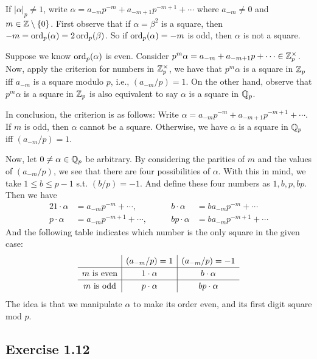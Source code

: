 \documentclass[../Koblitz.tex]{subfiles}
\begin{document}
If $|\alpha|_p\neq1$, write $\alpha=a_{-m}p^{-m}+a_{-m+1}p^{-m+1}+\cdots$ where $a_{-m}\neq0$ and $m\in\mathbb{Z}\setminus\{0\}$. First observe that if $\alpha=\beta^2$ is a square, then $-m=\operatorname{ord}_p(\alpha)=2\operatorname{ord}_p(\beta)$. So if $\operatorname{ord}_p(\alpha)=-m$ is odd, then $\alpha$ is not a square.

Suppose we know $\operatorname{ord}_p(\alpha)$ is even. Consider $p^m\alpha = a_{-m}+a_{-m+1}p+\cdots\in\mathbb{Z}_p^\times$. Now, apply the criterion for numbers in $\mathbb{Z}_p^\times$, we have that $p^m\alpha$ is a square in $\mathbb{Z}_p$ iff $a_{-m}$ is a square modulo $p$, i.e., $(a_{-m}/p)=1$. On the other hand, observe that $p^m\alpha$ is a square in $\mathbb{Z}_p$ is also equivalent to say $\alpha$ is a square in $\mathbb{Q}_p$.

In conclusion, the criterion is as follows: Write $\alpha=a_{-m}p^{-m}+a_{-m+1}p^{-m+1}+\cdots$. If $m$ is odd, then $\alpha$ cannot be a square. Otherwise, we have $\alpha$ is a square in $\mathbb{Q}_p$ iff $(a_{-m}/p)=1$.

Now, let $0\neq\alpha\in\mathbb{Q}_p$ be arbitrary. By considering the parities of $m$ and the values of $(a_{-m}/p)$, we see that there are four possibilities of $\alpha$. With this in mind, we take $1\leq b\leq p-1$ s.t. $(b/p)=-1$. And define these four numbers as $1,b,p,bp$. Then we have
\begin{alignat*}{2}
1\cdot\alpha &= a_{-m}p^{-m}+\cdots, &\qquad b\cdot\alpha &= ba_{-m}p^{-m}+\cdots \\
p\cdot\alpha &= a_{-m}p^{-m+1}+\cdots, &\qquad bp\cdot\alpha &= ba_{-m}p^{-m+1}+\cdots
\end{alignat*}
And the following table indicates which number is the only square in the given case:
$$
\def\arraystretch{1.2}
\begin{array}{c|c|c}
 & (a_{-m}/p)=1 & (a_{-m}/p)=-1 \\
\hline
m \text{ is even} & 1\cdot\alpha & b\cdot\alpha \\
\hline
m \text{ is odd} & p\cdot\alpha & bp\cdot\alpha
\end{array}
$$
The idea is that we manipulate $\alpha$ to make its order even, and its first digit square mod $p$.

\subsection*{Exercise 1.12}
\end{document}
